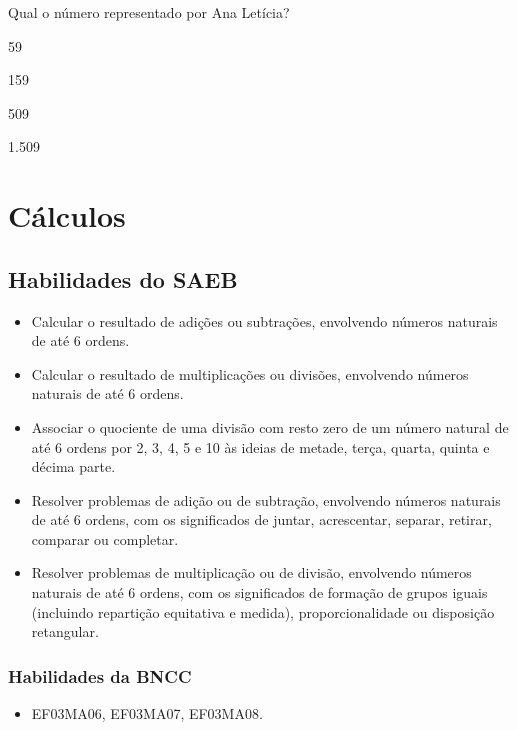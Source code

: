 Qual o número representado por Ana Letícia?

\begin{escolha}
\item
  59
\item
  159
\item
  509
\item
  1.509
\end{escolha}


\chapter{Cálculos}

\section*{Habilidades do SAEB}

\begin{itemize}
\item Calcular o resultado de adições ou subtrações, envolvendo números
naturais de até 6 ordens.

\item Calcular o resultado de multiplicações ou divisões, envolvendo números
naturais de até 6 ordens.

\item Associar o quociente de uma divisão com resto zero de um número
natural de até 6 ordens por 2, 3, 4, 5 e 10 às ideias de metade, terça,
quarta, quinta e décima parte.

\item Resolver problemas de adição ou de subtração, envolvendo números
naturais de até 6 ordens, com os significados de juntar, acrescentar,
separar, retirar, comparar ou completar.

\item Resolver problemas de multiplicação ou de divisão, envolvendo números
naturais de até 6 ordens, com os significados de formação de grupos
iguais (incluindo repartição equitativa e medida), proporcionalidade ou
disposição retangular.
\end{itemize}

\subsection{Habilidades da BNCC}

\begin{itemize}
\item EF03MA06, EF03MA07, EF03MA08.
\end{itemize}

